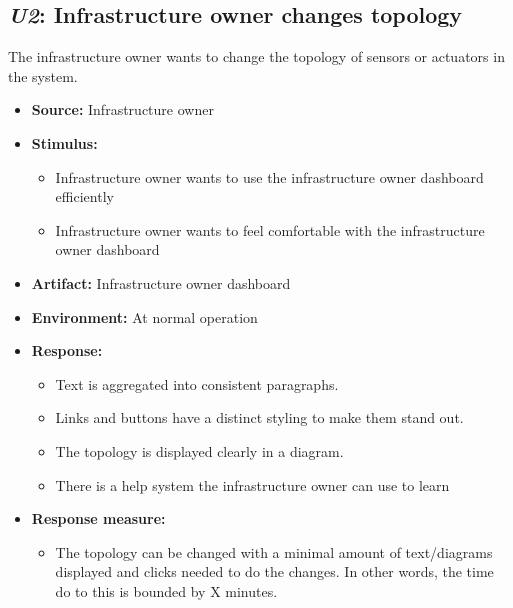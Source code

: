 \documentclass[english]{sareport}
\begin{document}
\subsection{\emph{U2}: Infrastructure owner changes topology}
The infrastructure owner wants to change the topology of sensors or actuators
in the system.

\begin{itemize}
    \item \textbf{Source:} Infrastructure owner
    \item \textbf{Stimulus:}
        \begin{itemize}
            \item Infrastructure owner wants to use the infrastructure owner
                  dashboard efficiently
            \item Infrastructure owner wants to feel comfortable with the
                  infrastructure owner dashboard
        \end{itemize}

    \item \textbf{Artifact:} Infrastructure owner dashboard
    \item \textbf{Environment:} At normal operation
    \item \textbf{Response:}
        \begin{itemize}
            \item Text is aggregated into consistent paragraphs.
            \item Links and buttons have a distinct styling to make them stand out.
            \item The topology is displayed clearly in a diagram.
            \item There is a help system the infrastructure owner can use to learn
        \end{itemize}

    \item \textbf{Response measure:}
        \begin{itemize}
            \item The topology can be changed with a minimal amount of text/diagrams
                  displayed and clicks needed to do the changes. In other words,
                  the time do to this is bounded by X minutes.
        \end{itemize}
\end{itemize}
\end{document}
